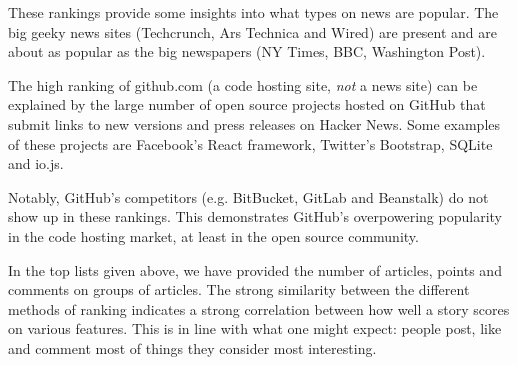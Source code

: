 These rankings provide some insights into what types on news are popular. The big geeky news sites (Techcrunch, Ars Technica and Wired) are present and are about as popular as the big newspapers (NY Times, BBC, Washington Post). 

The high ranking of github.com (a code hosting site, \textit{not} a news site) can be explained by the large number of open source projects hosted on GitHub that submit links to new versions and press releases on Hacker News. Some examples of these projects are Facebook's React framework, Twitter's Bootstrap, SQLite and io.js. 

Notably, GitHub's competitors (e.g. BitBucket, GitLab and Beanstalk) do not show up in these rankings. This demonstrates GitHub's overpowering popularity in the code hosting market, at least in the open source community.

In the top lists given above, we have provided the number of articles, points and comments on groups of articles. The strong similarity between the different methods of ranking indicates a strong correlation between how well a story scores on various features. This is in line with what one might expect: people post, like and comment most of things they consider most interesting.
